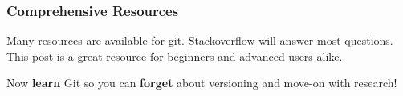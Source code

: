 \begin{frame}\frametitle{Comprehensive Resources}
    Many resources are available for git. 
    \href{http://stackoverflow.com/questions/tagged/git}{Stackoverflow} 
    will answer most questions. This 
    \href{http://stackoverflow.com/questions/315911/git-for-beginners-the-definitive-practical-guide}{post} is a great resource for beginners and advanced users alike.
\end{frame}

\begin{frame}
	Now \textbf{learn} Git so you can \textbf{forget} about
	versioning and move-on with research!
\end{frame}